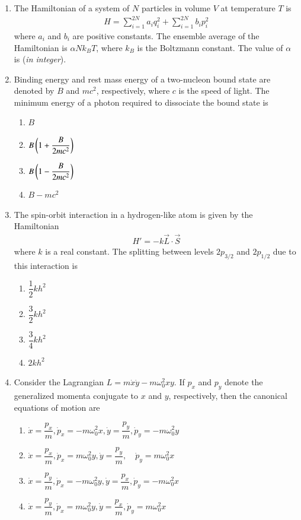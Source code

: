 \documentclass[journal,12pt,onecolumn]{IEEEtran}
\theoremstyle{remark}
\begin{document}
\begin{enumerate}
\item
The Hamiltonian of a system of $N$ particles in volume $V$ at temperature $T$ is
\begin{align*}
    H = \sum_{i=1}^{2N} a_i q_i^2 + \sum_{i=1}^{2N} b_i p_i^2
\end{align*}
where $a_i$ and $b_i$ are positive constants. The ensemble average of the Hamiltonian is $\alpha N k_B T$, where $k_B$ is the Boltzmann constant. The value of $\alpha$ is \underline{\hspace{2cm}} (\textit{in integer}).
\item Binding energy and rest mass energy of a two-nucleon bound state are denoted by $B$ and $mc^2$, respectively, where $c$ is the speed of light. The minimum energy of a photon required to dissociate the bound state is
\begin{enumerate}
    \item $B$
    \item $B \left( 1 + \dfrac{B}{2mc^2}\right) $
    \item $B \left( 1 - \dfrac{B}{2mc^2}\right) $
    \item $B - mc^2$
\end{enumerate}

\item The spin-orbit interaction in a hydrogen-like atom is given by the Hamiltonian
\begin{align*}
H' = -k\vec{L}\cdot \vec{S}
\end{align*}
where $k$ is a real constant. The splitting between levels $2p_{3/2}$ and $2p_{1/2}$ due to this interaction is
\begin{enumerate}
    \item $\dfrac{1}{2}kh^2$
    \item $\dfrac{3}{2}kh^2$
    \item $\dfrac{3}{4}kh^2$
    \item $2kh^2$
\end{enumerate}

\item
Consider the Lagrangian $L = m\dot{x}\dot{y} - m\omega_0^2 x y$. If $p_x$ and $p_y$ denote the generalized momenta conjugate to $x$ and $y$, respectively, then the canonical equations of motion are
\begin{enumerate}
    \item $\dot{x} = \dfrac{p_x}{m},\dot{p}_x = -m\omega_0^2 x, \dot{y} = \dfrac{p_y}{m}, \dot{p}_y = -m\omega_0^2 y$
    \item $\dot{x} = \dfrac{p_x}{m},\dot{p}_x = m\omega_0^2 y,\dot{y} = \dfrac{p_y}{m},\quad \dot{p}_y = m\omega_0^2 x$
    \item $\dot{x} = \dfrac{p_y}{m}, \dot{p}_x = -m\omega_0^2 y, \dot{y} = \dfrac{p_x}{m},\dot{p}_y = -m\omega_0^2 x$
    \item $\dot{x} = \dfrac{p_y}{m},\dot{p}_x = m\omega_0^2 y,\dot{y} = \dfrac{p_x}{m},\dot{p}_y = m\omega_0^2 x$
\end{enumerate}


\end{enumerate}
\end{document}
